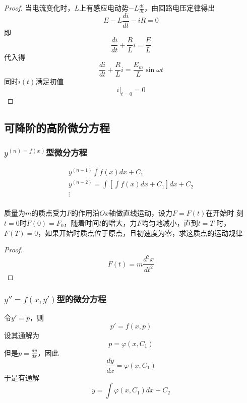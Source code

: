 \documentclass[11pt]{article}
\begin{document}
\begin{proof}
当电流变化时，\(L\)上有感应电动势\(-L\frac{di}{dt}\)，由回路电压定律得出
\begin{equation*}
E-L\frac{di}{dt}-iR=0
\end{equation*}
即
\begin{equation*}
\frac{di}{dt}+\frac{R}{L}i=\frac{E}{L}
\end{equation*}
代入得
\begin{equation*}
 \frac{di}{dt}+\frac{R}{L}i=\frac{E_m}{L}\sin\omega t
\end{equation*}
同时\(i(t)\)满足初值
\begin{equation*}
i|_{t=0}=0
\end{equation*}
\end{proof}
\subsection{可降阶的高阶微分方程}
\label{sec:orgf965a03}
\subsubsection{\(y^{(n)=f(x)}\)型微分方程}
\label{sec:orgd968058}
\begin{gather*}
y^{(n-1)}\int f(x)dx+C_1\\
y^{(n-2)}=\int[\int f(x)dx+C_1]dx+C_2\\
\vdots\\
\end{gather*}

\begin{proposition}[]
质量为\(m\)的质点受力\(F\)的作用沿\(Ox\)轴做直线运动，设力\(F=F(t)\)在开始时
刻\(t=0\)时\(F(0)=F_0\)，随着时间\(t\)的增大，力\(F\)均匀地减小，直到\(t=T\)
时，\(F(T)=0\)，如果开始时质点位于原点，且初速度为零，求这质点的运动规律
\end{proposition}

\begin{proof}
\begin{equation*}
F(t)=m\frac{d^2x}{dt^2}
\end{equation*}
\end{proof}
\subsubsection{\(y''=f(x,y')\)型的微分方程}
\label{sec:orgd4c95ad}
令\(y'=p\)，则
\begin{equation*}
p'=f(x,p)
\end{equation*}
设其通解为
\begin{equation*}
p=\varphi(x,C_1)
\end{equation*}
但是\(p=\frac{dy}{dx}\)，因此
\begin{equation*}
\frac{dy}{dx}=\varphi(x,C_1)
\end{equation*}
于是有通解
\begin{equation*}
y=\int\varphi(x,C_1)dx+C_2
\end{equation*}
\end{document}
